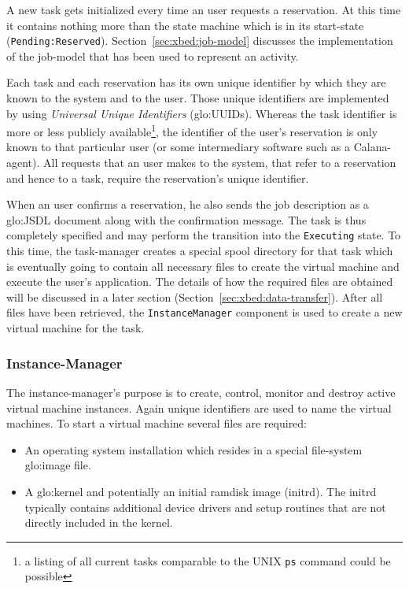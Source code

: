 A new task gets initialized every  time an user requests a reservation. At
this time it contains nothing more  than the state machine which is in its
start-state                               (\ie \texttt{Pending:Reserved}).
Section~\ref{sec:xbed:job-model}  discusses   the  implementation  of  the
job-model that has been used to  represent an activity.

Each task and each reservation has its own unique identifier by which they
are known  to the system  and to the  user.  Those unique  identifiers are
implemented     by    using     \emph{Universal     Unique    Identifiers}
(\gls{glo:UUID}s).  Whereas  the task identifier is more  or less publicly
available\footnote{a listing  of all current tasks comparable  to the UNIX
  \texttt{ps}  command could be  possible}, the  identifier of  the user's
reservation is  only known to  that particular user (or  some intermediary
software such as  a Calana-agent). All requests that an  user makes to the
system,  that refer  to a  reservation and  hence to  a task,  require the
reservation's unique identifier.

When an user confirms a reservation,  he also sends the job description as
a \gls{glo:JSDL}  document along with the confirmation  message.  The task
is  thus completely  specified and  may  perform the  transition into  the
\texttt{Executing} state. To this time, the task-manager creates a special
spool directory  for that  task which is  eventually going to  contain all
necessary  files to  create the  virtual  machine and  execute the  user's
application. The  details of how the  required files are  obtained will be
discussed  in   a  later  section  (Section~\ref{sec:xbed:data-transfer}).
After  all   files  have  been   retrieved,  the  \texttt{InstanceManager}
component is used to create a new virtual machine for the task.

\subsubsection{Instance-Manager}

The instance-manager's purpose is  to create, control, monitor and destroy
active virtual  machine instances.  Again  unique identifiers are  used to
name the  virtual machines. To start  a virtual machine  several files are
required:

\begin{itemize}
\item  An  operating  system  installation  which  resides  in  a  special
  file-system \gls{glo:image} file.
\item  A  \gls{glo:kernel}  and   potentially  an  initial  ramdisk  image
  (initrd). The  initrd typically  contains additional device  drivers and
  setup routines that are not directly included in the kernel.
\end{itemize}

